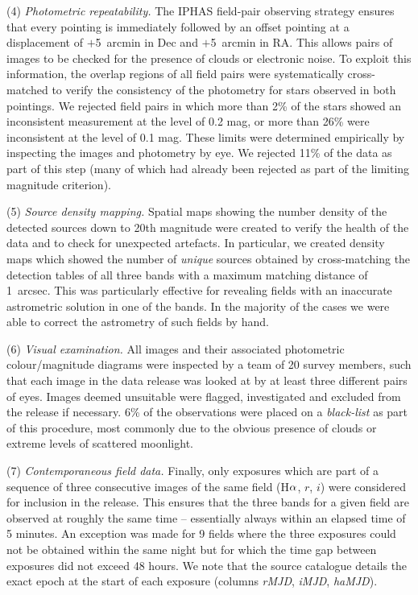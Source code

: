 \documentclass[useAMS,usenatbib]{mn2e}
\def\ha{\mbox{H$\rm \alpha$}}
\begin{document}
(4) \emph{Photometric repeatability.} 
The IPHAS field-pair observing strategy 
ensures that every pointing is immediately followed 
by an offset pointing at a displacement of $+$5~arcmin in Dec 
and $+$5~arcmin in RA.
This allows pairs of images to be checked 
for the presence of clouds or electronic noise.
To exploit this information,
the overlap regions of all field pairs were systematically cross-matched
to verify the consistency of the photometry
for stars observed in both pointings.
We rejected field pairs in which more than 2\% of the stars 
showed an inconsistent measurement at the level of 0.2 mag,
or more than 26\% were inconsistent at the level of 0.1 mag.
These limits were determined empirically by inspecting
the images and photometry by eye.
We rejected 11\% of the data as part of this step
(many of which had already been rejected as part of the limiting magnitude criterion).

(5) \emph{Source density mapping.}
Spatial maps showing the number density of the detected sources
down to 20th magnitude were created to verify the health
of the data and to check for unexpected artefacts.
In particular, we created density maps
which showed the number of \emph{unique} sources
obtained by cross-matching the detection tables of
all three bands with a maximum matching distance of 1~arcsec.
This was particularly effective for revealing
fields with an inaccurate astrometric solution in one of the bands.
In the majority of the cases we were able to correct the astrometry
of such fields by hand.

(6) \emph{Visual examination.}
All images and their associated photometric colour/magnitude diagrams
were inspected by a team of 20 survey members, 
such that each image in the data release 
was looked at by at least three different pairs of eyes.
Images deemed unsuitable were flagged, investigated and
excluded from the release if necessary. 
6\% of the observations were placed on a \emph{black-list}
as part of this procedure, most commonly due to the obvious presence
of clouds or extreme levels of scattered moonlight.

(7) \emph{Contemporaneous field data.} 
Finally, only exposures which are part of a sequence 
of three consecutive images of the same field
(\ha, $r$, $i$)
were considered for inclusion in the release. 
This ensures that the three bands for a given field
are observed at roughly the same time --  
essentially always within an elapsed time of 5 minutes.
An exception was made for 9 fields where the three exposures 
could not be obtained within the same night
but for which the time gap between exposures did not exceed 48 hours.
We note that the source catalogue details the exact epoch
at the start of each exposure
(columns \emph{rMJD}, \emph{iMJD}, \emph{haMJD}).
\end{document}
